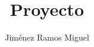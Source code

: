 \documentclass[10pt,a4paper,openany]{book}
\author{Jiménez Ramos Miguel}
\title{Proyecto}
\begin{document}
 
 \renewcommand{\thechapter}{\Roman{chapter}}
 \renewcommand*\contentsname{Contenido}


\tableofcontents
\listoffigures




\end{document}
